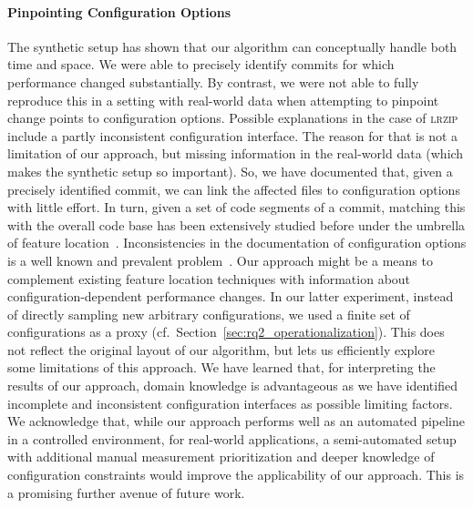 \documentclass[sigconf]{acmart}
\begin{document}
	\paragraph{Pinpointing Configuration Options}
	The synthetic setup has shown that our algorithm can conceptually handle both time and space. We were able to precisely identify commits for which performance changed substantially. By contrast, we were not able to fully reproduce this in a setting with real-world data when attempting to pinpoint change points to configuration options. Possible explanations in the case of \textsc{lrzip} include a partly inconsistent configuration interface. 
	The reason for that is not a limitation of our approach, but missing information in the real-world data (which makes the synthetic setup so important). So, we have documented that, given a precisely identified commit, we can link the affected files to configuration options with little effort. In turn, given a set of code segments of a commit, matching this with the overall code base has been extensively studied before under the umbrella of feature location~\cite{hill_which_2013}.
	Inconsistencies in the documentation of configuration options is a well known and prevalent problem~\cite{rabkin_static_2011}. Our approach might be a means to complement existing feature location techniques with information about configuration-dependent performance changes. 	
	In our latter experiment, instead of directly sampling new arbitrary configurations, we used a finite set of configurations as a proxy (cf.~Section~\ref{sec:rq2_operationalization}). This does not reflect the original layout of our algorithm, but lets us efficiently explore some limitations of this approach. We have learned that, for interpreting the results of our approach, domain knowledge is advantageous as we have identified incomplete and inconsistent configuration interfaces as possible limiting factors. We acknowledge that, while our approach performs well as an automated pipeline in a controlled environment, for real-world applications, a semi-automated setup with additional manual measurement prioritization and deeper knowledge of configuration constraints would improve the applicability of our approach. This is a promising further avenue of future work.
	
\end{document}
